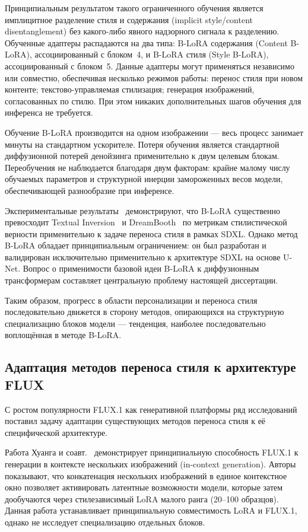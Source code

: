 Принципиальным результатом такого ограниченного обучения является имплицитное разделение стиля и содержания (implicit style/content disentanglement) без какого-либо явного надзорного сигнала к разделению. Обученные адаптеры распадаются на два типа: B-LoRA содержания (Content B-LoRA), ассоциированный с блоком~4, и B-LoRA стиля (Style B-LoRA), ассоциированный с блоком~5. Данные адаптеры могут применяться независимо или совместно, обеспечивая несколько режимов работы: перенос стиля при новом контенте; текстово-управляемая стилизация; генерация изображений, согласованных по стилю. При этом никаких дополнительных шагов обучения для инференса не требуется.

Обучение B-LoRA производится на одном изображении --- весь процесс занимает минуты на стандартном ускорителе. Потеря обучения является стандартной диффузионной потерей денойзинга применительно к двум целевым блокам. Переобучения не наблюдается благодаря двум факторам: крайне малому числу обучаемых параметров и структурной инерции замороженных весов модели, обеспечивающей разнообразие при инференсе.

Экспериментальные результаты~\cite{frenkel2024blora} демонстрируют, что B-LoRA существенно превосходит Textual Inversion~\cite{gal2023textualinversion} и DreamBooth~\cite{ruiz2023dreambooth} по метрикам стилистической верности применительно к задаче переноса стиля в рамках SDXL. Однако метод B-LoRA обладает принципиальным ограничением: он был разработан и валидирован исключительно применительно к архитектуре SDXL на основе U-Net. Вопрос о применимости базовой идеи B-LoRA к диффузионным трансформерам составляет центральную проблему настоящей диссертации.

Таким образом, прогресс в области персонализации и переноса стиля последовательно движется в сторону методов, опирающихся на структурную специализацию блоков модели --- тенденция, наиболее последовательно воплощённая в методе B-LoRA.


\subsection{Адаптация методов переноса стиля к архитектуре FLUX}

С ростом популярности FLUX.1 как генеративной платформы ряд исследований поставил задачу адаптации существующих методов переноса стиля к её специфической архитектуре.

Работа Хуанга и соавт.~\cite{huang2024iclora} демонстрирует принципиальную способность FLUX.1 к генерации в контексте нескольких изображений (in-context generation). Авторы показывают, что конкатенация нескольких изображений в единое контекстное окно позволяет активировать латентные возможности модели, которые затем дообучаются через стилезависимый LoRA малого ранга (20--100 образцов). Данная работа устанавливает принципиальную совместимость LoRA и FLUX.1, однако не исследует специализацию отдельных блоков.

